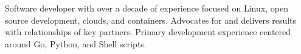


\begin{cvparagraph}

Software developer with over a decade of experience focused on Linux, open
source development, clouds, and containers. Advocates for and delivers results
with relationships of key partners. Primary development experience centered
around Go, Python, and Shell scripts.

\end{cvparagraph}
